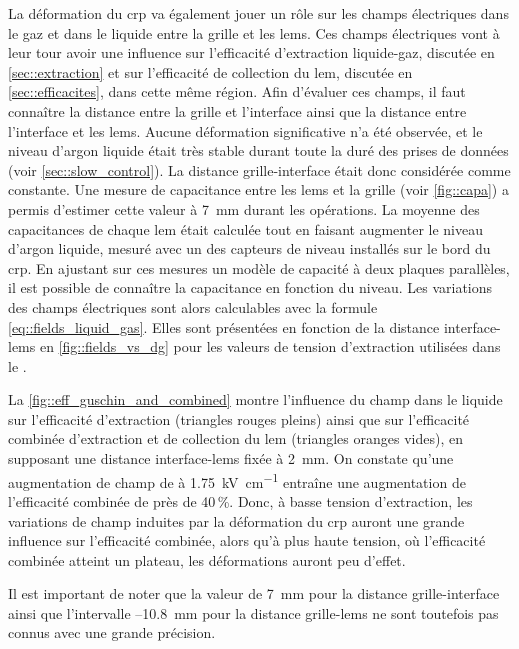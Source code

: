       La déformation du \gls{crp} va également jouer un rôle sur les champs électriques dans le gaz et dans le liquide entre la grille et les \glspl{lem}. Ces champs électriques vont à leur tour avoir une influence sur l'efficacité d'extraction liquide-gaz, discutée en \autoref{sec::extraction} et sur l'efficacité de collection du \gls{lem}, discutée en \autoref{sec::efficacites}, dans cette même région. Afin d'évaluer ces champs, il faut connaître la distance entre la grille et l'interface ainsi que la distance entre l'interface et les \glspl{lem}. Aucune déformation significative n'a été observée, et le niveau d'argon liquide était très stable durant toute la duré des prises de données (voir \autoref{sec::slow_control}). La distance grille-interface était donc considérée comme constante. Une mesure de capacitance entre les \glspl{lem} et la grille (voir \autoref{fig::capa}) a permis d'estimer cette valeur à \SI{7}{\milli\meter} durant les opérations. La moyenne des capacitances de chaque \gls{lem} était calculée tout en faisant augmenter le niveau d'argon liquide, mesuré avec un des capteurs de niveau installés sur le bord du \gls{crp}. En ajustant sur ces mesures un modèle de capacité à deux plaques parallèles, il est possible de connaître la capacitance en fonction du niveau. Les variations des champs électriques sont alors calculables avec la formule \eqref{eq::fields_liquid_gas}. Elles sont présentées en fonction de la distance interface-\glspl{lem} en \autoref{fig::fields_vs_dg} pour les valeurs de tension d'extraction utilisées dans le \TOO{}.

      La \autoref{fig::eff_guschin_and_combined} montre l'influence du champ dans le liquide sur l'efficacité d'extraction (triangles rouges pleins) ainsi que sur l'efficacité combinée d'extraction et de collection du \gls{lem} (triangles oranges vides), en supposant une distance interface-\glspl{lem} fixée à \SI{2}{\milli\meter}. On constate qu'une augmentation de champ de  à \SI{1.75}{\kilo\volt\per\centi\meter} entraîne une augmentation de l'efficacité combinée de près de 40\,\%. Donc, à basse tension d'extraction, les variations de champ induites par la déformation du \gls{crp} auront une grande influence sur l'efficacité combinée, alors qu'à plus haute tension, où l'efficacité combinée atteint un plateau, les déformations auront peu d'effet.

      Il est important de noter que la valeur de \SI{7}{\milli\meter} pour la distance grille-interface ainsi que l'intervalle --\SI{10.8}{\milli\meter} pour la distance grille-\glspl{lem} ne sont toutefois pas connus avec une grande précision.


